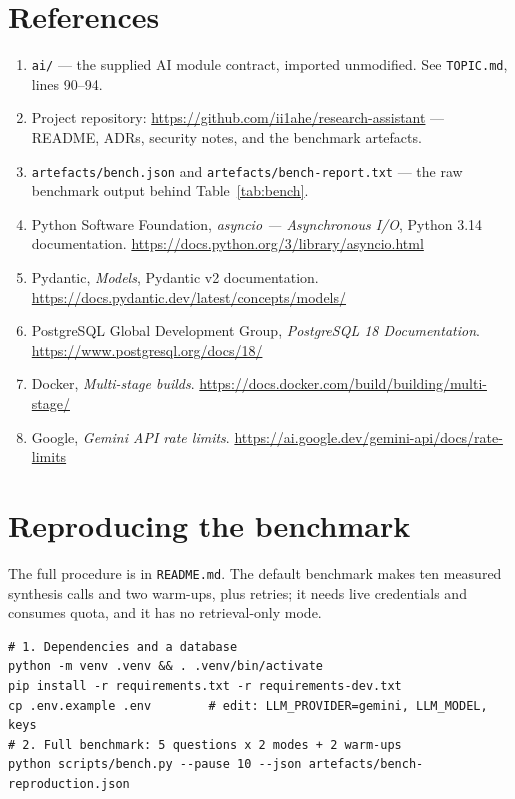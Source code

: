 \documentclass[10pt,a4paper]{article}
\begin{document}
\section{References}

\begin{enumerate}[leftmargin=1.6em,itemsep=0.2em]
  \item \texttt{ai/} --- the supplied AI module contract, imported unmodified. See
        \texttt{TOPIC.md}, lines 90--94.
  \item Project repository: \url{https://github.com/ii1ahe/research-assistant} --- README,
        ADRs, security notes, and the benchmark artefacts.
  \item \texttt{artefacts/bench.json} and \texttt{artefacts/bench-report.txt} --- the raw
        benchmark output behind Table~\ref{tab:bench}.
  \item Python Software Foundation, \emph{asyncio --- Asynchronous I/O}, Python 3.14
        documentation. \url{https://docs.python.org/3/library/asyncio.html}
  \item Pydantic, \emph{Models}, Pydantic v2 documentation.
        \url{https://docs.pydantic.dev/latest/concepts/models/}
  \item PostgreSQL Global Development Group, \emph{PostgreSQL 18 Documentation}.
        \url{https://www.postgresql.org/docs/18/}
  \item Docker, \emph{Multi-stage builds}.
        \url{https://docs.docker.com/build/building/multi-stage/}
  \item Google, \emph{Gemini API rate limits}.
        \url{https://ai.google.dev/gemini-api/docs/rate-limits}
\end{enumerate}

\appendix
\section{Reproducing the benchmark}

The full procedure is in \texttt{README.md}. The default benchmark makes ten measured synthesis
calls and two warm-ups, plus retries; it needs live credentials and consumes quota, and it has no
retrieval-only mode.

\begin{lstlisting}[style=python,numbers=none,basicstyle=\ttfamily\scriptsize]
# 1. Dependencies and a database
python -m venv .venv && . .venv/bin/activate
pip install -r requirements.txt -r requirements-dev.txt
cp .env.example .env        # edit: LLM_PROVIDER=gemini, LLM_MODEL, keys
# 2. Full benchmark: 5 questions x 2 modes + 2 warm-ups
python scripts/bench.py --pause 10 --json artefacts/bench-reproduction.json
\end{lstlisting}
\end{document}
